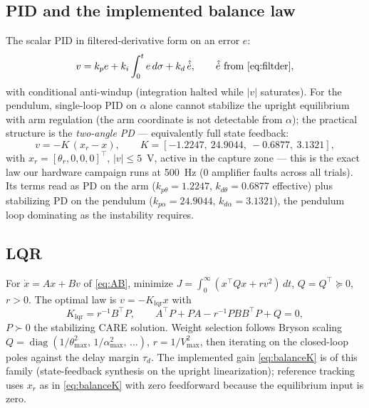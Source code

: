 \documentclass[conference]{IEEEtran}
\newcommand{\diag}{\operatorname{diag}}
\begin{document}
\subsection{PID and the implemented balance law}
The scalar PID in filtered-derivative form on an error $e$:
\begin{equation}
v = k_p e + k_i \int_0^t e\,d\sigma + k_d\,\hat{\dot e},\qquad
\hat{\dot e}\ \text{from \eqref{eq:filtder}},
\end{equation}
with conditional anti-windup (integration halted while $|v|$ saturates). For the pendulum, single-loop PID on $\alpha$ alone cannot stabilize the upright equilibrium with arm regulation (the arm coordinate is not detectable from $\alpha$); the practical structure is the \emph{two-angle PD} --- equivalently full state feedback:
\begin{equation}
\boxed{\;v = -K\,(x_r - x),\qquad
K = [-1.2247,\ 24.9044,\ -0.6877,\ 3.1321],\;}
\label{eq:balanceK}
\end{equation}
with $x_r = [\theta_r,0,0,0]^{\!\top}$, $|v|\le5$~V, active in the capture zone --- this is the exact law our hardware campaign runs at 500~Hz (0 amplifier faults across all trials). Its terms read as PD on the arm ($k_{p\theta} = 1.2247$, $k_{d\theta}=0.6877$ effective) plus stabilizing PD on the pendulum ($k_{p\alpha}=24.9044$, $k_{d\alpha}=3.1321$), the pendulum loop dominating as the instability requires.

\subsection{LQR}
For $\dot x = Ax + Bv$ of \eqref{eq:AB}, minimize
$J = \int_0^\infty (x^{\!\top}Qx + r v^2)\,dt$, $Q = Q^{\!\top}\!\succeq0$, $r>0$. The optimal law is $v = -K_{\mathrm{lqr}}x$ with
\begin{equation}
K_{\mathrm{lqr}} = r^{-1}B^{\!\top}P,\qquad
A^{\!\top}P + PA - r^{-1}PBB^{\!\top}P + Q = 0,
\label{eq:care}
\end{equation}
$P\succ0$ the stabilizing CARE solution. Weight selection follows Bryson scaling $Q = \diag(1/\theta_{\max}^2,\,1/\alpha_{\max}^2,\,\ldots)$, $r = 1/V_{\max}^2$, then iterating on the closed-loop poles against the delay margin $\tau_d$. The implemented gain \eqref{eq:balanceK} is of this family (state-feedback synthesis on the upright linearization); reference tracking uses $x_r$ as in \eqref{eq:balanceK} with zero feedforward because the equilibrium input is zero.
\end{document}
